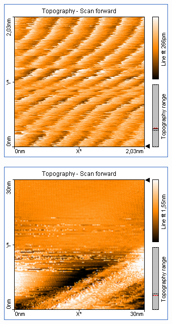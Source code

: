 \begin{figure}
\begin{subfigure}[b]{\picwidth}
        \caption{}
        \label{fig:graphit_06_08}
    \end{subfigure}
    \begin{subfigure}[b]{\picwidth}
        \includegraphics[width=\textwidth]{data/Graphit/pic_06_09_3nm}
        \caption{}
        \label{fig:graphit_06_09}
    \end{subfigure}\qquad
    \begin{subfigure}[b]{\picwidth}
        \includegraphics[width=\textwidth]{data/Graphit/pic_06_10_30nm}

\end{subfigure}
\end{figure}
